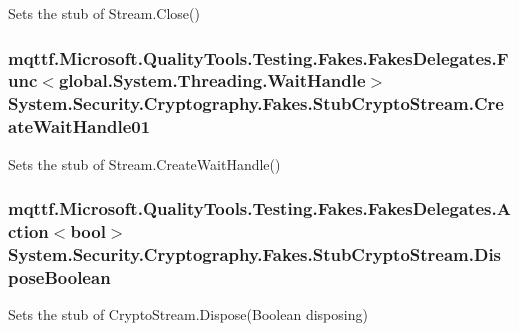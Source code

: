 Sets the stub of Stream.\-Close()

\hypertarget{class_system_1_1_security_1_1_cryptography_1_1_fakes_1_1_stub_crypto_stream_aeaf39a09916f20448269c022d5ab99ec}{
\subsubsection[{Create\-Wait\-Handle01}]{\setlength{\rightskip}{0pt plus 5cm}mqttf.\-Microsoft.\-Quality\-Tools.\-Testing.\-Fakes.\-Fakes\-Delegates.\-Func$<$global.\-System.\-Threading.\-Wait\-Handle$>$ System.\-Security.\-Cryptography.\-Fakes.\-Stub\-Crypto\-Stream.\-Create\-Wait\-Handle01}}\label{class_system_1_1_security_1_1_cryptography_1_1_fakes_1_1_stub_crypto_stream_aeaf39a09916f20448269c022d5ab99ec}


Sets the stub of Stream.\-Create\-Wait\-Handle()

\hypertarget{class_system_1_1_security_1_1_cryptography_1_1_fakes_1_1_stub_crypto_stream_afb4b1ab39426c48316f53e74feee9508}{
\subsubsection[{Dispose\-Boolean}]{\setlength{\rightskip}{0pt plus 5cm}mqttf.\-Microsoft.\-Quality\-Tools.\-Testing.\-Fakes.\-Fakes\-Delegates.\-Action$<$bool$>$ System.\-Security.\-Cryptography.\-Fakes.\-Stub\-Crypto\-Stream.\-Dispose\-Boolean}}\label{class_system_1_1_security_1_1_cryptography_1_1_fakes_1_1_stub_crypto_stream_afb4b1ab39426c48316f53e74feee9508}


Sets the stub of Crypto\-Stream.\-Dispose(\-Boolean disposing)

